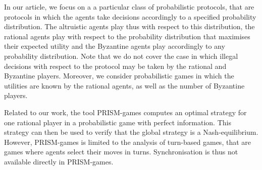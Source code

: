 In our article, we focus on a a particular class of probabilistic protocols, that are protocols in which the agents take decisions accordingly to a specified probability distribution. The altruistic agents play thus with respect to this distribution, the rational agents play  with respect to the probability distribution that maximises their expected utility and the Byzantine agents play accordingly to any probability distribution. Note that we do not cover the case in which illegal decisions with respect to the protocol may be taken by the rational and Byzantine players. Moreover, we consider probabilistic games in which the utilities are known by the rational agents, as well as the number of Byzantine players.

Related to our work, the tool PRISM-games \cite{CFKPS13} computes an optimal strategy for one rational player in a probabilistic game with perfect information. This strategy can then be used to verify that the global strategy is a Nash-equilibrium. However, PRISM-games is limited to the analysis of turn-based games, that are games where agents select their moves in turns. Synchronisation is thus not available directly in PRISM-games.